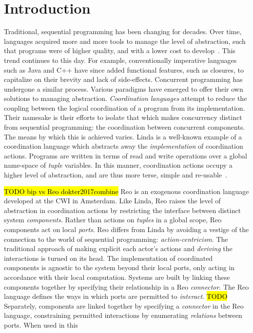 \chapter{Introduction}	


Traditional, sequential programming has been changing for decades. Over time, languages acquired more and more tools to manage the level of abstraction, such that programs were of higher quality, and with a lower cost to develop~\cite{shaw1984abstraction}. This trend continues to this day. For example, conventionally imperative languages such as Java and C++ have since added functional features, such as closures, to capitalize on their brevity and lack of side-effects. Concurrent programming has undergone a similar process. Various paradigms have emerged to offer their own solutions to managing abstraction. \textit{Coordination languages} attempt to reduce the coupling between the logical coordination of a program from its implementation. Their namesake is their efforts to isolate that which makes concurrency distinct from sequential programming: the coordination between concurrent components. The means by which this is achieved varies. Linda is a well-known example of a coordination language which abstracts away the \textit{implementation} of coordination actions. Programs are written in terms of read and write operations over a global name-space of \textit{tuple} variables. In this manner, coordination actions occupy a higher level of abstraction, and are thus more terse, simple and re-usable~\cite{gelernter1985generative}.

\hl{TODO bip vs Reo dokter2017combine}
Reo is an exogenous coordination language developed at the CWI in Amsterdam. Like Linda, Reo raises the level of abstraction in coordination actions by restricting the interface between distinct system \textit{components}. Rather than actions on \textit{tuples} in a global scope, Reo components act on local \textit{ports}. Reo differs from Linda by avoiding a vestige of the connection to the world of sequential programming: \textit{action-centricism}. The traditional approach of making explicit each actor's actions and \textit{deriving} the interactions is turned on its head. The implementation of coordinated components is agnostic to the system beyond their local ports, only acting in accordance with their local computation. Systems are built by linking these components together by specifying their relationship in a Reo \textit{connector}. The Reo language defines the ways in which ports are permitted to \textit{interact}. 
\hl{TODO}
Separately, components are linked together by specifying a \textit{connector} in the Reo language, constraining permitted interactions by enumerating \textit{relations} between ports. When used in this

